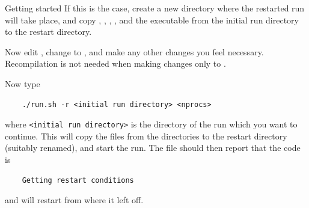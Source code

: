 \begin{chapter}{\label{cha:quickstart}Getting started}
  If this is the case, create a new directory where the restarted run will take
  place, and copy , , ,
  , and the executable  from the initial run
  directory to the restart directory.

  Now edit , change  to , and
  make any other changes you feel necessary.  Recompilation is not needed when
  making changes only to .

  Now type
  \begin{Verbatim}
    ./run.sh -r <initial run directory> <nprocs>
  \end{Verbatim}
  where \verb"<initial run directory>" is the directory of the run which you
  want to continue.  This will copy the  files from the
   directories to the restart directory (suitably renamed), and
  start the run.  The  file should then report that the code
  is
  \begin{Verbatim}
    Getting restart conditions
  \end{Verbatim}
  and will restart from where it left off.
\end{chapter}
